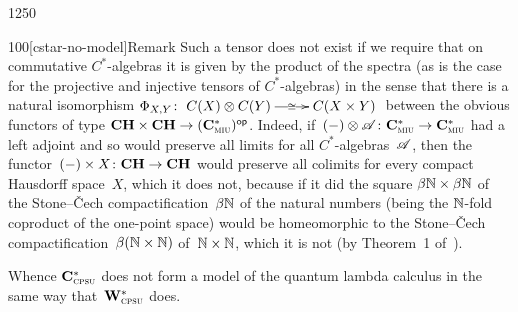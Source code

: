 \begin{parsec}{1250}
\begin{point}{100}[cstar-no-model]{Remark}
Such a tensor does not exist
if we require that
on commutative
$C^*$-algebras it is given by the product of the spectra
(as is the case for the projective and injective tensors
of $C^*$-algebras)
in the sense that there
is a natural isomorphism
$\Phi_{X,Y}\colon 
\smash{\xymatrix{
C(X)\otimes C(Y)
\ar[r]|-{\cong}
&
C(X\times  Y)}}$ 
between the obvious functors of type $\mathbf{CH}\times \mathbf{CH}\to {(\mathbf{C}^*_{\text{\textsc{miu}}})}{^{\mathsf{op}}}$.
Indeed, if~$(-)\otimes \mathscr{A}\colon \mathbf{C}^*_{\text{\textsc{miu}}}\to\mathbf{C}^*_{\text{\textsc{miu}}}$
had a left adjoint 
and so would preserve all limits
for all $C^*$-algebras~$\mathscr{A}$,
then the functor~$(-)\times X\colon \mathbf{CH}\to\mathbf{CH}$
would preserve all colimits
for every compact Hausdorff space~$X$,
which it does not,
because if it did
the square $\beta\mathbb{N} \times \beta\mathbb{N}$ of
the Stone--\v{C}ech compactification~$\beta\mathbb{N}$
of the natural numbers (being the $\mathbb{N}$-fold
coproduct of the one-point space)
would be homeomorphic to the Stone--\v{C}ech
compactification~$\beta(\mathbb{N}\times \mathbb{N})$
of~$\mathbb{N}\times \mathbb{N}$,
which it is not (by Theorem~1 of~\cite{glicksberg1959}).

Whence
$\mathbf{C}^*_{\text{\textsc{cpsu}}}$
does not form a model of the quantum lambda calculus
in the same way that~$\mathbf{W}^*_{\text{\textsc{cpsu}}}$ does.
\end{point}
\end{parsec}
